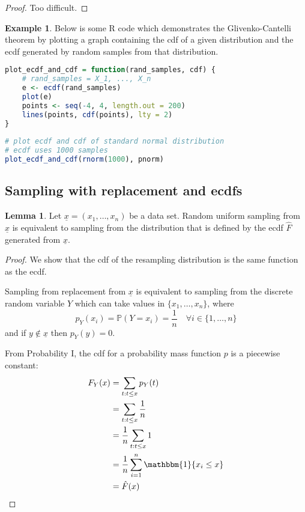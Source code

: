 \documentclass[12pt,a4paper]{article}
\theoremstyle{definition}
\newtheorem{lemma}[definition]{Lemma}
\newtheorem{example}[definition]{Example}
\begin{document}
\begin{proof}
	Too difficult.
\end{proof}

\begin{example}
	Below is some R code which demonstrates the Glivenko-Cantelli theorem by plotting a graph containing the cdf of a given distribution and the ecdf generated by random samples from that distribution.

	\begin{lstlisting}[language=R]
plot_ecdf_and_cdf = function(rand_samples, cdf) {
	# rand_samples = X_1, ..., X_n
	e <- ecdf(rand_samples)
	plot(e)
	points <- seq(-4, 4, length.out = 200)
	lines(points, cdf(points), lty = 2)
}
	
# plot ecdf and cdf of standard normal distribution
# ecdf uses 1000 samples
plot_ecdf_and_cdf(rnorm(1000), pnorm)
	\end{lstlisting}
\end{example}

\subsection{Sampling with replacement and ecdfs}

\begin{lemma}
	Let $\underline{x} = (x_1, \dots, x_n)$ be a data set. Random uniform sampling from $\underline{x}$ is equivalent to sampling from the distribution that is defined by the ecdf $\hat{F}$ generated from $\underline{x}$.
\end{lemma}

\begin{proof}
	We show that the cdf of the resampling distribution is the same function as the ecdf.

	Sampling from replacement from $\underline{x}$ is equivalent to sampling from the discrete random variable $Y$ which can take values in $\{ x_1, \dots, x_n \}$, where
	\[
		p_Y(x_i) = \mathbb{P}(Y = x_i) = \frac{1}{n} \quad \forall i \in \{ 1, \dots, n \}
	\]
	and if $y \notin \underline{x}$ then $p_Y(y) = 0$.

	From Probability I, the cdf for a probability mass function $p$ is a piecewise constant:
	\[
		\begin{aligned}
			F_Y(x)
				& = \sum_{t: t \le x} p_Y(t) \\
				& = \sum_{t: t \le x} \frac{1}{n} \\
				& = \frac{1}{n} \sum_{t: t \le x} 1 \\
				& = \frac{1}{n} \sum_{i = 1}^n \mathbbm{1} \{ x_i \le x \} \\
				& = \hat{F}(x)
		\end{aligned}
	\]
\end{proof}
\end{document}
